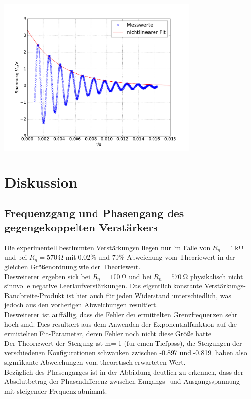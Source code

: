 \documentclass[]{scrartcl}
\let\oldsection\section
\renewcommand\section{\clearpage\oldsection}
\begin{document}
\begin{center}
	\includegraphics[width=10cm]{images/schwing_abfall.pdf}
	\label{fig:expfit}
\end{center}

\section{Diskussion}

\subsection{Frequenzgang und Phasengang des gegengekoppelten Verstärkers}
Die experimentell bestimmten Verstärkungen liegen nur im Falle von $R_n=\SI{1}{\kilo\ohm}$ und bei $R_n=\SI{570}{\ohm}$ mit 0.02\% und 70\% Abweichung vom Theoriewert in der gleichen Größenordnung wie der Theoriewert. \\
Desweiteren ergeben sich bei $R_n=\SI{100}{\ohm}$ und bei $R_n=\SI{570}{\ohm}$ physikalisch nicht sinnvolle negative Leerlaufverstärkungen. Das eigentlich konstante Verstärkungs-Bandbreite-Produkt ist hier auch für jeden Widerstand unterschiedlich, was jedoch aus den vorherigen Abweichungen resultiert. \\
Desweiteren ist auffällig, dass die Fehler der ermittelten Grenzfrequenzen sehr hoch sind. Dies resultiert aus dem Anwenden der Exponentialfunktion auf die ermittelten Fit-Parameter, deren Fehler noch nicht diese Größe hatte. \\
Der Theoriewert der Steigung ist m=-1 (für einen Tiefpass), die Steigungen der verschiedenen Konfigurationen schwanken zwischen -0.897 und -0.819, haben also signifikante Abweichungen vom theoretisch erwarteten Wert. \\
Bezüglich des Phasenganges ist in der Abbildung deutlich zu erkennen, dass der Absolutbetrag der Phasendifferenz zwischen Eingangs- und Ausgangsspannung mit steigender Frequenz abnimmt. 
\end{document}
